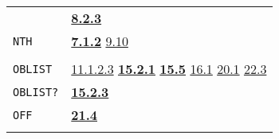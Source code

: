 \documentclass[a4paper,]{article}
\begin{document}
\begin{longtable}[]{@{}ll@{}}
\begin{minipage}[t]{0.24\columnwidth}
\end{minipage} & \begin{minipage}[t]{0.70\columnwidth}\raggedright\strut
\textbf{\href{08-truth.md\#823-boolean-operators-1}{8.2.3}}\strut
\end{minipage}\tabularnewline
\begin{minipage}[t]{0.24\columnwidth}\raggedright\strut
\texttt{NTH}\strut
\end{minipage} & \begin{minipage}[t]{0.70\columnwidth}\raggedright\strut
\textbf{\href{07-structured-objects.md\#712-nth-1}{7.1.2}} \href{09-functions.md\#910-apply-1}{9.10}\strut
\end{minipage}\tabularnewline
\begin{minipage}[t]{0.24\columnwidth}\raggedright\strut
\strut
\end{minipage} & \begin{minipage}[t]{0.70\columnwidth}\raggedright\strut
\strut
\end{minipage}\tabularnewline
\begin{minipage}[t]{0.24\columnwidth}\raggedright\strut
\texttt{OBLIST}\strut
\end{minipage} & \begin{minipage}[t]{0.70\columnwidth}\raggedright\strut
\href{11-input-output.md\#11123-princ}{11.1.2.3} \textbf{\href{15-lexical-blocking.md\#1521-oblist-names}{15.2.1}}
\textbf{\href{15-lexical-blocking.md\#155-initial-state}{15.5}} \href{16-errors-frames-etc.md\#161-listen}{16.1}
\href{20-coroutines.md\#201-process-the-type}{20.1} \href{22-storage-management.md\#223-other-storage}{22.3}\strut
\end{minipage}\tabularnewline
\begin{minipage}[t]{0.24\columnwidth}\raggedright\strut
\texttt{OBLIST?}\strut
\end{minipage} & \begin{minipage}[t]{0.70\columnwidth}\raggedright\strut
\textbf{\href{15-lexical-blocking.md\#1523-oblist}{15.2.3}}\strut
\end{minipage}\tabularnewline
\begin{minipage}[t]{0.24\columnwidth}\raggedright\strut
\texttt{OFF}\strut
\end{minipage} & \begin{minipage}[t]{0.70\columnwidth}\raggedright\strut
\textbf{\href{21-interrupts.md\#214-off}{21.4}}\strut
\end{minipage}\tabularnewline
\begin{minipage}[t]{0.24\columnwidth}\raggedright\strut

\end{minipage}
\end{longtable}
\end{document}
